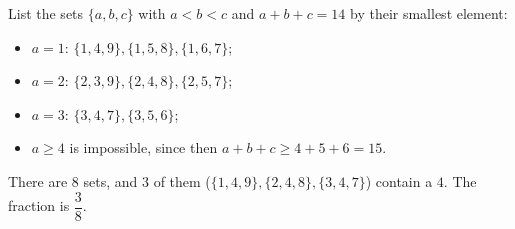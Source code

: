 List the sets $\{a,b,c\}$ with $a<b<c$ and $a+b+c=14$ by their smallest element:
\begin{itemize}
\item $a=1$: $\{1,4,9\},\{1,5,8\},\{1,6,7\}$;
\item $a=2$: $\{2,3,9\},\{2,4,8\},\{2,5,7\}$;
\item $a=3$: $\{3,4,7\},\{3,5,6\}$;
\item $a\ge4$ is impossible, since then $a+b+c\ge4+5+6=15$.
\end{itemize}
There are $8$ sets, and $3$ of them ($\{1,4,9\},\{2,4,8\},\{3,4,7\}$) contain a $4$. The fraction is $\boxed{\dfrac{3}{8}}$.
